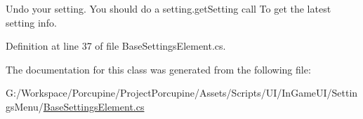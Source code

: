 Undo your setting. You should do a setting.\+get\+Setting call To get the latest setting info. 



Definition at line 37 of file Base\+Settings\+Element.\+cs.



The documentation for this class was generated from the following file\+:\begin{DoxyCompactItemize}
\item 
G\+:/\+Workspace/\+Porcupine/\+Project\+Porcupine/\+Assets/\+Scripts/\+U\+I/\+In\+Game\+U\+I/\+Settings\+Menu/\hyperlink{_base_settings_element_8cs}{Base\+Settings\+Element.\+cs}\end{DoxyCompactItemize}
